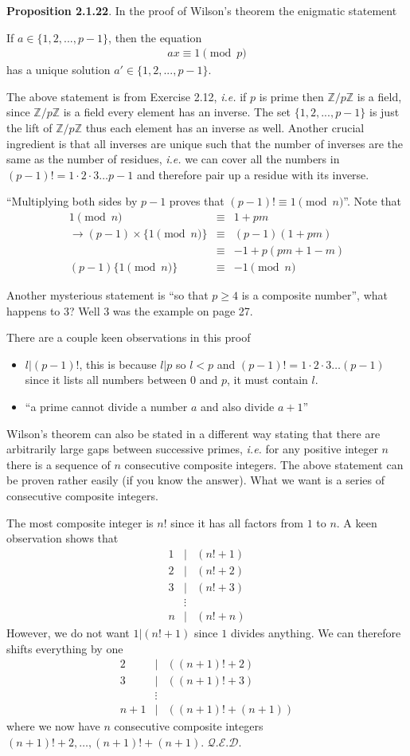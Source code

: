 \documentclass[aps,preprint,preprintnumbers,nofootinbib,showpacs,prd]{revtex4-1}
\newcommand{\ie}{{\it i.e.} }
\newcommand{\bit}{\begin{itemize}}
\newcommand{\eit}{\end{itemize}}
\newcommand{\nbea}{\begin{eqnarray*}}
\newcommand{\neea}{\end{eqnarray*}}
\begin{document}
{\bf Proposition 2.1.22}. In the proof of Wilson's theorem the enigmatic statement

If $a \in \{1, 2, . . . , p - 1\}$, then the equation
%
\nbea
ax \equiv 1 \pmod{p}
\neea
%
has a unique solution $a' \in \{1, 2, . . . , p - 1\}$. 

The above statement is from Exercise 2.12, \ie if $p$ is prime then $\mathbb{Z}/p\mathbb{Z}$ is a field, since $\mathbb{Z}/p\mathbb{Z}$ is a field every element has an inverse. The set $\{1, 2, . . . , p - 1\}$ is just the lift of $\mathbb{Z}/p\mathbb{Z}$ thus each element has an inverse as well. Another crucial ingredient is that all inverses are unique such that the number of inverses are the same as the number of residues, \ie we can cover all the numbers in $(p-1)! = 1\cdot 2\cdot 3 \dots p-1$ and therefore pair up a residue with its inverse.

``Multiplying both sides by $p-1$ proves that $(p-1)! \equiv 1 \pmod{n}$''. Note that
%
\nbea
1 \pmod{n} & \equiv & 1 + pm \\
\to (p-1) \times \{1 \pmod{n}\} & \equiv & (p-1)(1 + pm) \\
& \equiv & -1 + p(pm + 1 - m) \\
(p-1) \{1\pmod{n}\} & \equiv & -1 \pmod{n}
\neea
%

Another mysterious statement is ``so that $p \ge 4$ is a composite number'', what happens to 3? Well 3 was the example on page 27.

There are a couple keen observations in this proof
\bit
\item $l|(p-1)!$, this is because $l|p$ so $l < p$ and $(p-1)! = 1\cdot 2\cdot 3 \dots (p-1)$ since it lists all numbers between 0 and $p$, it must contain $l$.
\item ``a prime cannot divide a number $a$ and also divide $a+1$''
\eit

Wilson's theorem can also be stated in a different way stating that there are arbitrarily large gaps between successive primes, \ie for any positive integer $n$ there is a sequence of $n$ consecutive composite integers. The above statement can be proven rather easily (if you know the answer). What we want is a series of consecutive composite integers.

The most composite integer is $n!$ since it has all factors from $1$ to $n$. A keen observation shows that
%
\nbea
1 &|& (n! + 1) \\
2 &|& (n! + 2) \\
3 &|& (n! + 3) \\
&\vdots& \\
n &|& (n! + n)
\neea
%
However, we do not want $1|(n! + 1)$ since $1$ divides anything. We can therefore shifts everything by one
%
\nbea
2 &|& ((n+1)! + 2) \\
3 &|& ((n+1)! + 3) \\
&\vdots& \\
n+1 &|& ((n+1)! +(n+1))
\neea
%
where we now have $n$ consecutive composite integers $(n+1)! + 2 , \dots, (n+1)! +(n+1)$. $\mathcal{Q.E.D}$.
\end{document}
